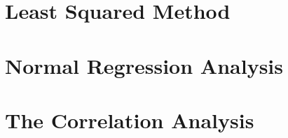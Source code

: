 \section{Least Squared Method}

\section{Normal Regression Analysis}

\section{The Correlation Analysis}

